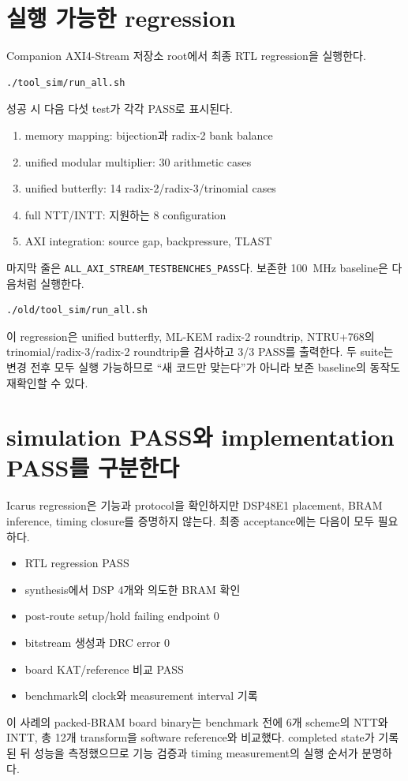 \section{실행 가능한 regression}

Companion AXI4-Stream 저장소 root에서 최종 RTL regression을 실행한다.

\begin{lstlisting}[language=bash,numbers=none]
./tool_sim/run_all.sh
\end{lstlisting}

성공 시 다음 다섯 test가 각각 PASS로 표시된다.

\begin{enumerate}
  \item memory mapping: bijection과 radix-2 bank balance
  \item unified modular multiplier: 30 arithmetic cases
  \item unified butterfly: 14 radix-2/radix-3/trinomial cases
  \item full NTT/INTT: 지원하는 8 configuration
  \item AXI integration: source gap, backpressure, TLAST
\end{enumerate}

마지막 줄은 \texttt{ALL\_AXI\_STREAM\_TESTBENCHES\_PASS}다. 보존한 100~MHz
baseline은 다음처럼 실행한다.

\begin{lstlisting}[language=bash,numbers=none]
./old/tool_sim/run_all.sh
\end{lstlisting}

이 regression은 unified butterfly, ML-KEM radix-2 roundtrip, NTRU+768의
trinomial/radix-3/radix-2 roundtrip을 검사하고 3/3 PASS를 출력한다. 두 suite는
변경 전후 모두 실행 가능하므로 ``새 코드만 맞는다''가 아니라 보존 baseline의
동작도 재확인할 수 있다.

\section{simulation PASS와 implementation PASS를 구분한다}

Icarus regression은 기능과 protocol을 확인하지만 DSP48E1 placement, BRAM
inference, timing closure를 증명하지 않는다. 최종 acceptance에는 다음이 모두
필요하다.

\begin{itemize}
  \item RTL regression PASS
  \item synthesis에서 DSP 4개와 의도한 BRAM 확인
  \item post-route setup/hold failing endpoint 0
  \item bitstream 생성과 DRC error 0
  \item board KAT/reference 비교 PASS
  \item benchmark의 clock와 measurement interval 기록
\end{itemize}

이 사례의 packed-BRAM board binary는 benchmark 전에 6개 scheme의 NTT와 INTT,
총 12개 transform을 software reference와 비교했다. completed state가 기록된 뒤
성능을 측정했으므로 기능 검증과 timing measurement의 실행 순서가 분명하다.
